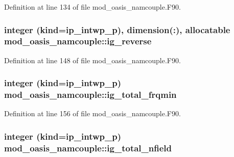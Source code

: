 Definition at line 134 of file mod\+\_\+oasis\+\_\+namcouple.\+F90.

\hypertarget{classmod__oasis__namcouple_adc4dcf30da2b88fb1798dd02e7833bc1}{
\subsubsection[{ig\+\_\+reverse}]{\setlength{\rightskip}{0pt plus 5cm}integer (kind=ip\+\_\+intwp\+\_\+p), dimension(\+:), allocatable mod\+\_\+oasis\+\_\+namcouple\+::ig\+\_\+reverse\hspace{0.3cm}{\ttfamily [private]}}}\label{classmod__oasis__namcouple_adc4dcf30da2b88fb1798dd02e7833bc1}


Definition at line 148 of file mod\+\_\+oasis\+\_\+namcouple.\+F90.

\hypertarget{classmod__oasis__namcouple_a839912711f8d2f44a825689e2673d0dd}{
\subsubsection[{ig\+\_\+total\+\_\+frqmin}]{\setlength{\rightskip}{0pt plus 5cm}integer (kind=ip\+\_\+intwp\+\_\+p) mod\+\_\+oasis\+\_\+namcouple\+::ig\+\_\+total\+\_\+frqmin\hspace{0.3cm}{\ttfamily [private]}}}\label{classmod__oasis__namcouple_a839912711f8d2f44a825689e2673d0dd}


Definition at line 156 of file mod\+\_\+oasis\+\_\+namcouple.\+F90.

\hypertarget{classmod__oasis__namcouple_a3de3e6eb2bf1e81d77e9c117b7d5985f}{
\subsubsection[{ig\+\_\+total\+\_\+nfield}]{\setlength{\rightskip}{0pt plus 5cm}integer (kind=ip\+\_\+intwp\+\_\+p) mod\+\_\+oasis\+\_\+namcouple\+::ig\+\_\+total\+\_\+nfield\hspace{0.3cm}{\ttfamily [private]}}}\label{classmod__oasis__namcouple_a3de3e6eb2bf1e81d77e9c117b7d5985f}


